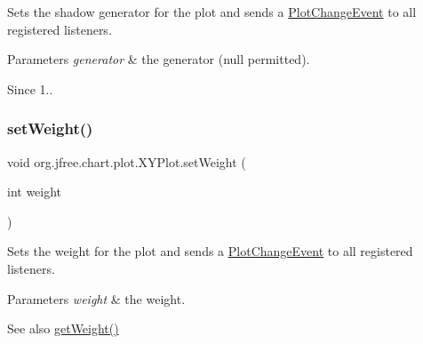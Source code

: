 Sets the shadow generator for the plot and sends a \mbox{\hyperlink{}{Plot\+Change\+Event}} to all registered listeners.


\begin{DoxyParams}{Parameters}
{\em generator} & the generator ({\ttfamily null} permitted).\\
\hline
\end{DoxyParams}
\begin{DoxySince}{Since}
1.. 
\end{DoxySince}
\mbox{\label{classorg_1_1jfree_1_1chart_1_1plot_1_1_x_y_plot_afaafdbf238357cc108dd1972fa94a7f3}} 
\subsubsection{\texorpdfstring{set\+Weight()}{setWeight()}}
{\footnotesize\ttfamily void org.\+jfree.\+chart.\+plot.\+X\+Y\+Plot.\+set\+Weight (\begin{DoxyParamCaption}\item[{int}]{weight }\end{DoxyParamCaption})}

Sets the weight for the plot and sends a \mbox{\hyperlink{}{Plot\+Change\+Event}} to all registered listeners.


\begin{DoxyParams}{Parameters}
{\em weight} & the weight.\\
\hline
\end{DoxyParams}
\begin{DoxySeeAlso}{See also}
\mbox{\hyperlink{classorg_1_1jfree_1_1chart_1_1plot_1_1_x_y_plot_a98d5fc48e4f913f8b3dd35c8b7a803c6}{get\+Weight()}} 
\end{DoxySeeAlso}
\mbox{\label{classorg_1_1jfree_1_1chart_1_1plot_1_1_x_y_plot_ae19a0a54a2ea8a5f86da75f04133eb10}} 
